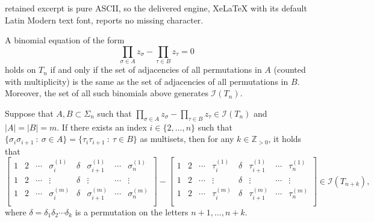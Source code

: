 \documentclass[10pt,a4paper]{amsart}
\newcommand{\ci}{\mathcal{I}}
\newcommand{\zz}{\mathbb{Z}}
\begin{document}
retained excerpt is pure ASCII, so the delivered engine, XeLaTeX with its default Latin Modern text font, reports no missing character.
\begin{proposition}
\label{prop:toric-gens-via-adjs}
A binomial equation of the form 
$$\prod\limits_{\sigma\in A} z_\sigma - \prod\limits_{\tau\in B} z_\tau = 0$$
holds on $T_n$ if and only if the set of adjacencies of all permutations in $A$ (counted with multiplicity) is the same as the set of adjacencies of all permutations in $B$. Moreover, the set of all such binomials above generates $\ci(T_n)$. 
\end{proposition}

\begin{lemma}
\label{lemma:lift-binomials}
Suppose that $A, B \subset \Sigma_n$ such that $\prod\limits_{\sigma\in A} z_\sigma - \prod\limits_{\tau\in B} z_\tau \in \ci(T_n)$ and $|A| = |B| = m$. If there exists an index $i \in \{2,\ldots, n\}$ such that $\{\sigma_i \sigma_{i+1} ~:~ \sigma \in A \} = \{\tau_i \tau_{i+1} ~:~ \tau \in B \}$ as multisets, then for any $k \in \zz_{>0}$, it holds that
\begin{equation}
\label{eqn:lift-binomial}
\begin{bmatrix}
1 & 2 & \cdots & \sigma_i^{(1)} & \delta & \sigma_{i + 1}^{(1)} & \cdots & \sigma_n^{(1)} \\
1 & 2 & \cdots & \vdots         & \delta & \vdots               & \cdots & \vdots  \\
1 & 2 & \cdots & \sigma_i^{(m)} & \delta & \sigma_{i + 1}^{(m)} & \cdots & \sigma_n^{(m)} \\
\end{bmatrix} - 
\begin{bmatrix}
1 & 2 & \cdots & \tau_i^{(1)} & \delta & \tau_{i + 1}^{(1)} & \cdots & \tau_n^{(1)} \\
1 & 2 & \cdots & \vdots       & \delta & \vdots             & \cdots & \vdots  \\
1 & 2 & \cdots & \tau_i^{(m)} & \delta & \tau_{i + 1}^{(m)} & \cdots & \tau_n^{(m)} \\
\end{bmatrix} \in \ci(T_{n + k}), 
\end{equation}
where $\delta = \delta_1 \delta_2 \cdots \delta_k$ is a permutation on the letters $n+1, \ldots, n+k$.
\end{lemma}
\end{document}
